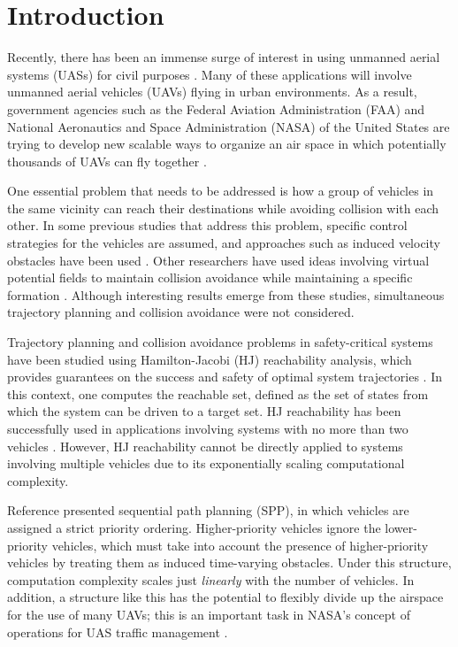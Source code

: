 \section{Introduction}
Recently, there has been an immense surge of interest in using unmanned aerial systems (UASs) for civil purposes \cite{Debusk10, Amazon16, AUVSI16, BBC16}. Many of these applications will involve unmanned aerial vehicles (UAVs) flying in urban environments. As a result, government agencies such as the Federal Aviation Administration (FAA) and National Aeronautics and Space Administration (NASA) of the United States are trying to develop new scalable ways to organize an air space in which potentially thousands of UAVs can fly together \cite{FAA13, Kopardekar16}.

One essential problem that needs to be addressed is how a group of vehicles in the same vicinity can reach their destinations while avoiding collision with each other. In some previous studies that address this problem, specific control strategies for the vehicles are assumed, and approaches such as induced velocity obstacles have been used \cite{Fiorini98, Chasparis05, Vandenberg08}. Other researchers have used ideas involving virtual potential fields to maintain collision avoidance while maintaining a specific formation \cite{Saber02, Chuang07}. Although interesting results emerge from these studies, simultaneous trajectory planning and collision avoidance were not considered. 

Trajectory planning and collision avoidance problems in safety-critical systems have been studied using Hamilton-Jacobi (HJ) reachability analysis, which provides guarantees on the success and safety of optimal system trajectories \cite{Barron90, Mitchell05, Bokanowski10, Margellos11, Fisac15}. In this context, one computes the reachable set, defined as the set of states from which the system can be driven to a target set. HJ reachability has been successfully used in applications involving systems with no more than two vehicles \cite{Mitchell05, Ding08, Huang11, Bayen07}. However, HJ reachability cannot be directly applied to systems involving multiple vehicles due to its exponentially scaling computational complexity. 

Reference \cite{Chen15} presented sequential path planning (SPP), in which vehicles are assigned a strict priority ordering. Higher-priority vehicles ignore the lower-priority vehicles, which must take into account the presence of higher-priority vehicles by treating them as induced time-varying obstacles. Under this structure, computation complexity scales just \textit{linearly} with the number of vehicles. In addition, a structure like this has the potential to flexibly divide up the airspace for the use of many UAVs; this is an important task in NASA's concept of operations for UAS traffic management \cite{Kopardekar16}. 

